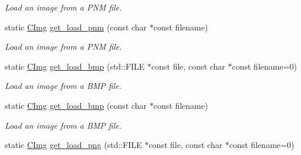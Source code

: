 \begin{DoxyCompactItemize}
\begin{DoxyCompactList}\small\item\em Load an image from a P\-N\-M file. \end{DoxyCompactList}\item 
\hypertarget{structcimg__library_1_1_c_img_ab13c7148c1089c070b2f8860d3a485ee}{static \hyperlink{structcimg__library_1_1_c_img}{C\-Img} \hyperlink{structcimg__library_1_1_c_img_ab13c7148c1089c070b2f8860d3a485ee}{get\-\_\-load\-\_\-pnm} (const char $\ast$const filename)}\label{structcimg__library_1_1_c_img_ab13c7148c1089c070b2f8860d3a485ee}

\begin{DoxyCompactList}\small\item\em Load an image from a P\-N\-M file. \end{DoxyCompactList}\item 
\hypertarget{structcimg__library_1_1_c_img_ab7bee0877eb6b5e27cee3abf2ade45cf}{static \hyperlink{structcimg__library_1_1_c_img}{C\-Img} \hyperlink{structcimg__library_1_1_c_img_ab7bee0877eb6b5e27cee3abf2ade45cf}{get\-\_\-load\-\_\-bmp} (std\-::\-F\-I\-L\-E $\ast$const file, const char $\ast$const filename=0)}\label{structcimg__library_1_1_c_img_ab7bee0877eb6b5e27cee3abf2ade45cf}

\begin{DoxyCompactList}\small\item\em Load an image from a B\-M\-P file. \end{DoxyCompactList}\item 
\hypertarget{structcimg__library_1_1_c_img_a30b95dca92e8488a9d2d0c5923a8247a}{static \hyperlink{structcimg__library_1_1_c_img}{C\-Img} \hyperlink{structcimg__library_1_1_c_img_a30b95dca92e8488a9d2d0c5923a8247a}{get\-\_\-load\-\_\-bmp} (const char $\ast$const filename)}\label{structcimg__library_1_1_c_img_a30b95dca92e8488a9d2d0c5923a8247a}

\begin{DoxyCompactList}\small\item\em Load an image from a B\-M\-P file. \end{DoxyCompactList}\item 
\hypertarget{structcimg__library_1_1_c_img_ad812108bdb1d2a6928e509c9bc8c1c08}{static \hyperlink{structcimg__library_1_1_c_img}{C\-Img} \hyperlink{structcimg__library_1_1_c_img_ad812108bdb1d2a6928e509c9bc8c1c08}{get\-\_\-load\-\_\-png} (std\-::\-F\-I\-L\-E $\ast$const file, const char $\ast$const filename=0)}\label{structcimg__library_1_1_c_img_ad812108bdb1d2a6928e509c9bc8c1c08}


\end{DoxyCompactItemize}
